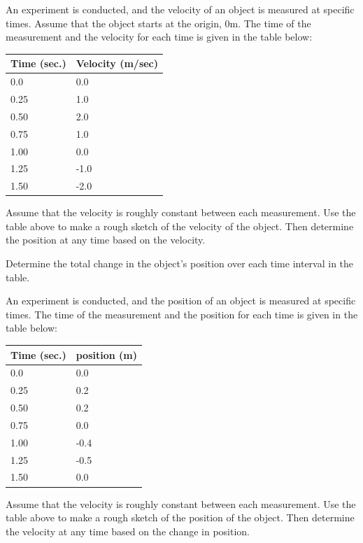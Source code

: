 \begin{problem}
\item An experiment is conducted, and the velocity of an object is
  measured at specific times. Assume that the object starts at the
  origin, 0m. The time of the measurement and the
  velocity for each time is given in the table below: \\
  \begin{tabular}{ll}
    Time (sec.) & Velocity (m/sec) \\ \hline
    0.0  & 0.0 \\
    0.25 & 1.0 \\
    0.50 & 2.0 \\
    0.75 & 1.0 \\
    1.00 & 0.0 \\
    1.25 & -1.0 \\
    1.50 & -2.0
  \end{tabular}
  \begin{subproblem}
  \item Assume that the velocity is roughly constant between each
    measurement. Use the table above to make a rough sketch of the
    velocity of the object. Then determine the position at any time
    based on the velocity.

    \scalebox{0.8}{}

  \item Determine the total change in the object's position over each
    time interval in the table.

    \vfill

  \end{subproblem}

  \clearpage

\item An experiment is conducted, and the position of an object is
  measured at specific times. The time of the measurement and the
  position for each time is given in the table below: \\
  \begin{tabular}{ll}
    Time (sec.) & position (m) \\ \hline
    0.0  & 0.0 \\
    0.25 & 0.2 \\
    0.50 & 0.2 \\
    0.75 & 0.0 \\
    1.00 & -0.4 \\
    1.25 & -0.5 \\
    1.50 & 0.0
  \end{tabular}
  \begin{subproblem}
  \item Assume that the velocity is roughly constant between each
    measurement. Use the table above to make a rough sketch of the
    position of the object. Then determine the velocity at any time
    based on the change in position.


\end{subproblem}
\end{problem}

